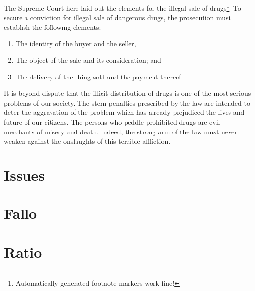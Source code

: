 \documentclass[
onehalfspacing,
14pt
]{Assignment}
\author{Student Name}
\begin{document}
\pagestyle{fancy}
\fancyhead{} %
\fancyhead[R]{\textbf{\ttitle}}
\fancyhead[L]{\authorname}
\fancyfoot[L]{\supname}
\fancyfoot[R]{\subjectname}

The Supreme Court here laid out the elements for the illegal sale of drugs\footnote{Automatically generated footnote markers work fine!}. To secure a conviction for illegal sale of dangerous drugs, the prosecution must establish the following elements:

\begin{enumerate}
  \item  The identity of the buyer and the seller,
  \item The object of the sale and its consideration; and
  \item  The delivery of the thing sold and the payment thereof.
\end{enumerate}

\lipsum[1]

\begin{displayquote}
It is beyond dispute that the illicit distribution of drugs is one of the most serious problems of our society. The stern penalties prescribed by the law are intended to deter the aggravation of the problem which has already prejudiced the lives and future of our citizens. The persons who peddle prohibited drugs are evil merchants of misery and death. Indeed, the strong arm of the law must never weaken against the onslaughts of this terrible affliction.
\end{displayquote}

\lipsum[2]

\section*{Issues}

\lipsum[3]

\section*{Fallo}
\lipsum[4]


\section*{Ratio}
\lipsum[5]
\end{document}
